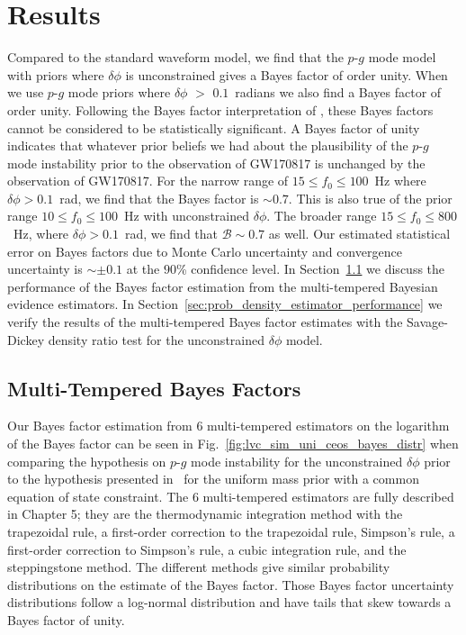 \section{Results}
\label{sec:results}
Compared to the standard waveform model, we find that the $p$-$g$ mode model with priors where $\delta \phi$ is unconstrained gives a Bayes factor of order unity. When we use $p$-$g$ mode priors where $\delta \phi$ $>$ $0.1$~radians we also find a Bayes factor of order unity. Following the Bayes factor interpretation of \cite{kass1995bayes, jeffreys1998theory}, these Bayes factors cannot be considered to be statistically significant. A Bayes factor of unity indicates that whatever prior beliefs we had about the plausibility of the $p$-$g$ mode instability prior to the observation of GW170817 is unchanged by the observation of GW170817. For the narrow range of $15 \le f_0 \le 100$~Hz where $\delta \phi > 0.1$~rad, we find that the Bayes factor is $\sim 0.7$. This is also true of the prior range $10 \le f_0 \le 100$~Hz with unconstrained $\delta \phi$. The broader range  $15 \le f_0 \le 800$~Hz, where $\delta \phi > 0.1$~rad, we find that $\mathcal{B} \sim 0.7$ as well. Our estimated statistical error on Bayes factors due to Monte Carlo uncertainty and convergence uncertainty is $\sim \pm 0.1$ at the $90$\% confidence level. In Section~\ref{sec:ti_ssa_performance} we discuss the performance of the Bayes factor estimation from the multi-tempered Bayesian evidence estimators. In Section~\ref{sec:prob_density_estimator_performance} we verify the results of the multi-tempered Bayes factor estimates with the Savage-Dickey density ratio test for the unconstrained $\delta \phi$ model. 

\subsection{Multi-Tempered Bayes Factors}\label{sec:ti_ssa_performance}
Our Bayes factor estimation from $6$ multi-tempered estimators on the logarithm of the Bayes factor can be seen in Fig.~\ref{fig:lvc_sim_uni_ceos_bayes_distr} when comparing the hypothesis on $p$-$g$ mode instability for the unconstrained $\delta \phi$ prior to the hypothesis presented in~\cite{de2018tidal} for the uniform mass prior with a common equation of state constraint. The $6$ multi-tempered estimators are fully described in Chapter 5; they are the thermodynamic integration method with the trapezoidal rule, a first-order correction to the trapezoidal rule, Simpson's rule, a first-order correction to Simpson's rule, a cubic integration rule, and the steppingstone method. The different methods give similar probability distributions on the estimate of the Bayes factor. Those Bayes factor uncertainty distributions follow a log-normal distribution and have tails that skew towards a Bayes factor of unity.

